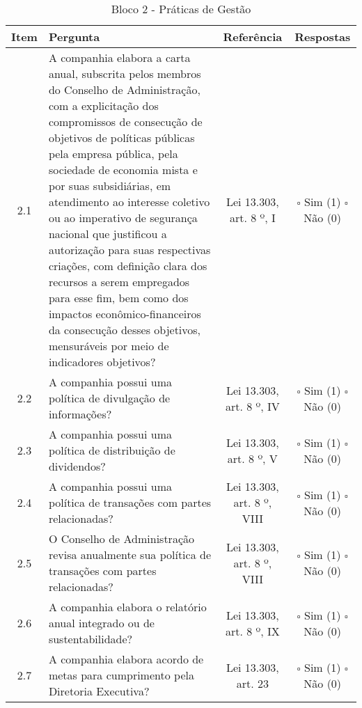 \begin{center}
\begin{longtable}{c l c c}
\caption{Bloco 2 - Práticas de Gestão} \label{tab:dim_zero} \\
\hline
 Item & Pergunta & Referência & Respostas \\ 
 \hline
2.1 &\parbox[t]{8cm}{A companhia elabora a carta anual, subscrita pelos membros do Conselho de Administração, com a explicitação dos compromissos de consecução de objetivos de políticas públicas pela empresa pública, pela sociedade de economia mista e por suas subsidiárias, em atendimento ao interesse coletivo ou ao imperativo de segurança nacional que justificou a autorização para suas respectivas criações, com definição clara dos recursos a serem empregados para esse fim, bem como dos impactos econômico-financeiros da consecução desses objetivos, mensuráveis por meio de indicadores objetivos?} & \parbox[t]{2cm}{Lei 13.303, art. 8 º, I} & \parbox[t]{2cm}{$\square$ Sim (1) \\ $\square$ Não (0)}\\
2.2 &\parbox[t]{8cm}{A companhia possui uma política de divulgação de informações?} & \parbox[t]{2cm}{Lei 13.303, art. 8 º, IV} & \parbox[t]{2cm}{$\square$ Sim (1) \\ $\square$ Não (0)}\\
2.3 &\parbox[t]{8cm}{A companhia possui uma política de distribuição de dividendos?} & \parbox[t]{2cm}{Lei 13.303, art. 8 º, V} & \parbox[t]{2cm}{$\square$ Sim (1) \\ $\square$ Não (0)}\\
2.4 &\parbox[t]{8cm}{A companhia possui uma política de transações com partes relacionadas?} & \parbox[t]{2cm}{Lei 13.303, art. 8 º, VIII} & \parbox[t]{2cm}{$\square$ Sim (1) \\ $\square$ Não (0)}\\
2.5 &\parbox[t]{8cm}{O Conselho de Administração revisa anualmente sua política de transações com partes relacionadas?} & \parbox[t]{2cm}{Lei 13.303, art. 8 º, VIII} & \parbox[t]{2cm}{$\square$ Sim (1) \\ $\square$ Não (0)}\\
2.6 &\parbox[t]{8cm}{A companhia elabora o relatório anual integrado ou de sustentabilidade?} & \parbox[t]{2cm}{Lei 13.303, art. 8 º, IX} & \parbox[t]{2cm}{$\square$ Sim (1) \\ $\square$ Não (0)}\\
2.7 &\parbox[t]{8cm}{A companhia elabora acordo de metas para cumprimento pela Diretoria Executiva?} & \parbox[t]{2cm}{Lei 13.303, art. 23} & \parbox[t]{2cm}{$\square$ Sim (1) \\ $\square$ Não (0)}\\

\end{longtable}
\end{center}
